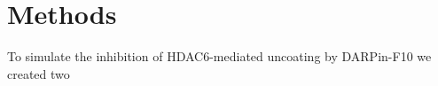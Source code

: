 \section{Methods}

To simulate the inhibition of HDAC6-mediated uncoating by DARPin-F10 we created two 